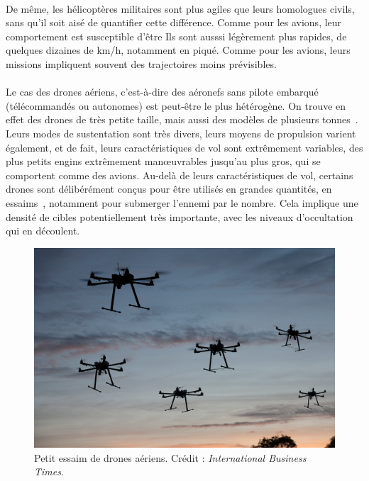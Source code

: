 	\paragraph{}
	De même, les hélicoptères militaires sont plus agiles que leurs homologues civils, sans qu'il soit aisé de quantifier cette différence. Comme pour les avions, leur comportement est susceptible d'être  Ils sont ausssi légèrement plus rapides, de quelques dizaines de km/h, notamment en piqué. Comme pour les avions, leurs missions impliquent souvent des trajectoires moins prévisibles.
	
	\paragraph{}
	Le cas des drones aériens, c'est-à-dire des aéronefs sans pilote embarqué (télécommandés ou autonomes) est peut-être le plus hétérogène. On trouve en effet des drones de très petite taille, mais aussi des modèles de plusieurs tonnes~\cite{reaper}. Leurs modes de sustentation sont très divers, leurs moyens de propulsion varient également, et de fait, leurs caractéristiques de vol sont extrêmement variables, des plus petits engins extrêmement manœuvrables jusqu'au plus gros, qui se comportent comme des avions. Au-delà de leurs caractéristiques de vol, certains drones sont délibérément conçus pour être utilisés en grandes quantités, en essaims~\cite{locust, alonso2016distributed, saska2014autonomous}, notamment pour submerger l'ennemi par le nombre. Cela implique une densité de cibles potentiellement très importante, avec les niveaux d'occultation qui en découlent.
	
	\begin{figure}[H]
		\centering
		\includegraphics[width=\textwidth]{figures/swarm}
		\caption{Petit essaim de drones aériens. Crédit : \emph{International Business Times}.}
		\label{fig:swarm}
	\end{figure}
	
